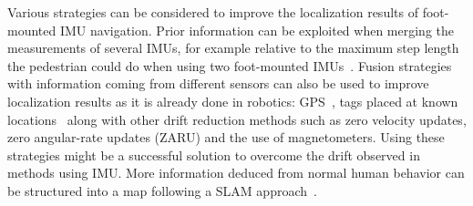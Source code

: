 Various strategies can be considered to improve the localization results of foot-mounted IMU navigation.
Prior information can be exploited when merging the measurements of several IMUs, for example relative to the maximum step length the pedestrian could do when using two foot-mounted IMUs~\cite{skog2012fusing}.
Fusion strategies with information coming from different sensors can also be used to improve localization results as it is already done
 in robotics: GPS~\cite{sukkarieh1999high,hide2012investigating},
  tags placed at known locations~\cite{ruiz2012accurate} along with other drift reduction methods such as zero velocity updates, zero angular-rate updates (ZARU) and the use of magnetometers.
Using these strategies might be a successful solution to overcome the drift observed in methods using IMU.%
 More information deduced from normal human behavior can be structured into a map following a SLAM approach~\cite{angermann2012footslam}.
